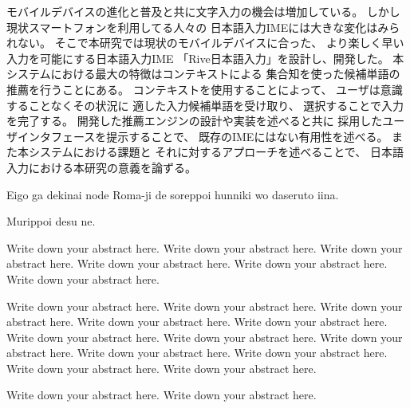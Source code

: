 


\begin{jabstract}

モバイルデバイスの進化と普及と共に文字入力の機会は増加している。
しかし現状スマートフォンを利用してる人々の
日本語入力IMEには大きな変化はみられない。
そこで本研究では現状のモバイルデバイスに合った、
より楽しく早い入力を可能にする日本語入力IME
「Rive日本語入力」を設計し、開発した。
本システムにおける最大の特徴はコンテキストによる
集合知を使った候補単語の推薦を行うことにある。
コンテキストを使用することによって、
ユーザは意識することなくその状況に
適した入力候補単語を受け取り、
選択することで入力を完了する。
開発した推薦エンジンの設計や実装を述べると共に
採用したユーザインタフェースを提示することで、
既存のIMEにはない有用性を述べる。
また本システムにおける課題と
それに対するアプローチを述べることで、
日本語入力における本研究の意義を論ずる。

\end{jabstract}

\begin{eabstract}

Eigo ga dekinai node Roma-ji de soreppoi hunniki wo daseruto iina.

Murippoi desu ne.

Write down your abstract here. Write down your abstract here. Write down your abstract here. Write down your abstract here. Write down your abstract here. Write down your abstract here.

 Write down your abstract here. Write down your abstract here. Write down your abstract here. Write down your abstract here. Write down your abstract here. Write down your abstract here. Write down your abstract here. Write down your abstract here. Write down your abstract here. Write down your abstract here. Write down your abstract here. Write down your abstract here.

Write down your abstract here. Write down your abstract here.

\end{eabstract}
